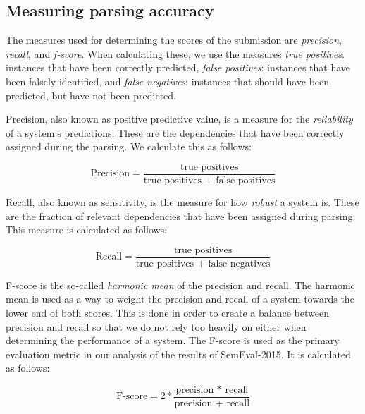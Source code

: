 \subsection{Measuring parsing accuracy}

The measures used for determining the scores of the submission are \textit{precision}, \textit{recall}, and \textit{f-score}. When calculating these, we use the measures \textit{true positives}: instances that have been correctly predicted, \textit{false positives}: instances that have been falsely identified, and \textit{false negatives}: instances that should have been predicted, but have not been predicted.

Precision, also known as positive predictive value, is a measure for the \textit{reliability} of a system's predictions. These are the dependencies that have been correctly assigned during the parsing. We calculate this as follows:

\begin{equation*}
    \text{Precision} = \frac{\text{true positives}}{\text{true positives + false positives}}
\end{equation*}

\vspace{1ex}

Recall, also known as sensitivity, is the measure for how \textit{robust} a system is. These are the fraction of relevant dependencies that have been assigned during parsing. This measure is calculated as follows:

\begin{equation*}
    \text{Recall} = \frac{\text{true positives}}{\text{true positives + false
            negatives}}
\end{equation*}

\vspace{1ex}

F-score is the so-called \textit{harmonic mean} of the precision and recall. The harmonic mean is used as a way to weight the precision and recall of a system towards the lower end of both scores. This is done in order to create a balance between precision and recall so that we do not rely too heavily on either when determining the performance of a system. The F-score is used as the primary evaluation metric in our analysis of the results of SemEval-2015. It is calculated as follows:

\begin{equation*}
    \text{F-score} = 2*\frac{\text{precision * recall}}{\text{precision + recall}}
\end{equation*}

